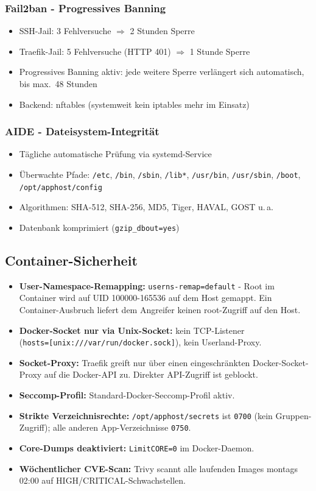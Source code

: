 \subsubsection*{Fail2ban - Progressives Banning}
\begin{itemize}
  \item SSH-Jail: 3 Fehlversuche $\Rightarrow$ 2 Stunden Sperre
  \item Traefik-Jail: 5 Fehlversuche (HTTP 401) $\Rightarrow$ 1 Stunde Sperre
  \item Progressives Banning aktiv: jede weitere Sperre verlängert sich automatisch, bis max.\ 48 Stunden
  \item Backend: nftables (systemweit kein iptables mehr im Einsatz)
\end{itemize}

\subsubsection*{AIDE - Dateisystem-Integrität}
\begin{itemize}
  \item Tägliche automatische Prüfung via systemd-Service
  \item Überwachte Pfade: \texttt{/etc}, \texttt{/bin}, \texttt{/sbin}, \texttt{/lib*}, \texttt{/usr/bin}, \texttt{/usr/sbin}, \texttt{/boot}, \texttt{/opt/apphost/config}
  \item Algorithmen: SHA-512, SHA-256, MD5, Tiger, HAVAL, GOST u.\,a.
  \item Datenbank komprimiert (\texttt{gzip\_dbout=yes})
\end{itemize}


\subsection{Container-Sicherheit}
\begin{itemize}
  \item \textbf{User-Namespace-Remapping:} \texttt{userns-remap=default} - Root im Container wird auf UID 100000-165536 auf dem Host gemappt. Ein Container-Ausbruch liefert dem Angreifer keinen root-Zugriff auf den Host.
  \item \textbf{Docker-Socket nur via Unix-Socket:} kein TCP-Listener \\
  (\texttt{hosts=[\textquotedbl{}unix:///var/run/docker.sock\textquotedbl{}]}), kein Userland-Proxy.
  \item \textbf{Socket-Proxy:} Traefik greift nur über einen eingeschränkten Docker-Socket-Proxy auf die Docker-API zu. Direkter API-Zugriff ist geblockt.
  \item \textbf{Seccomp-Profil:} Standard-Docker-Seccomp-Profil aktiv.
  \item \textbf{Strikte Verzeichnisrechte:} \texttt{/opt/apphost/secrets} ist \texttt{0700} (kein Gruppen-Zugriff); alle anderen App-Verzeichnisse \texttt{0750}.
  \item \textbf{Core-Dumps deaktiviert:} \texttt{LimitCORE=0} im Docker-Daemon.
  \item \textbf{Wöchentlicher CVE-Scan:} Trivy scannt alle laufenden Images montags 02:00 auf HIGH/CRITICAL-Schwachstellen.
\end{itemize}

